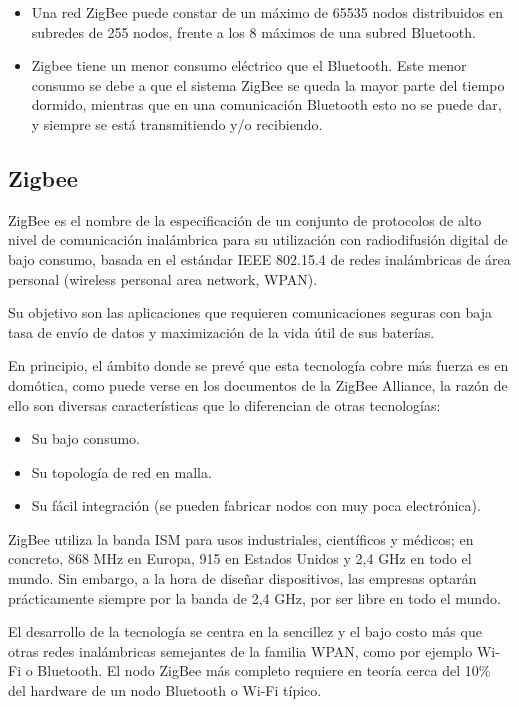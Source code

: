 \begin{itemize}
\item Una red ZigBee puede constar de un m\'aximo de 65535 nodos distribuidos en subredes de 255 nodos, frente a los 8
m\'aximos de una subred Bluetooth. 
\item Zigbee tiene un menor consumo el\'ectrico que el Bluetooth. Este menor consumo se debe a que el sistema ZigBee se
queda la mayor parte del tiempo dormido, mientras que en una comunicaci\'on Bluetooth esto no se puede dar, y siempre se
est\'a transmitiendo y/o recibiendo.
\end{itemize}



\subsection{Zigbee}
ZigBee es el nombre de la especificaci\'on de un conjunto de protocolos de alto nivel de comunicaci\'on inal\'ambrica para su
utilizaci\'on con radiodifusi\'on digital de bajo consumo, basada en el est\'andar IEEE 802.15.4 de redes inal\'ambricas de
\'area personal (wireless personal area network, WPAN).

Su objetivo son las aplicaciones que requieren comunicaciones seguras con baja tasa de env\'io de datos y maximizaci\'on de
la vida \'util de sus bater\'ias.

En principio, el \'ambito donde se prev\'e que esta tecnolog\'ia cobre m\'as fuerza es en dom\'otica, como puede verse en los
documentos de la ZigBee Alliance, la raz\'on de ello son diversas caracter\'isticas que lo diferencian de otras
tecnolog\'ias:

\begin{itemize}
\item Su bajo consumo.
\item Su topolog\'ia de red en malla.
\item Su f\'acil integraci\'on (se pueden fabricar nodos con muy poca electr\'onica).
\end{itemize}
ZigBee utiliza la banda ISM para usos industriales, cient\'ificos y m\'edicos; en concreto, 868 MHz en Europa, 915 en
Estados Unidos y 2,4 GHz en todo el mundo. Sin embargo, a la hora de dise\~nar dispositivos, las empresas optar\'an
pr\'acticamente siempre por la banda de 2,4 GHz, por ser libre en todo el mundo.

El desarrollo de la tecnolog\'ia se centra en la sencillez y el bajo costo m\'as que otras redes inal\'ambricas semejantes de
la familia WPAN, como por ejemplo Wi-Fi o Bluetooth. El nodo ZigBee m\'as completo requiere en teor\'ia cerca del 10\% del
hardware de un nodo Bluetooth o Wi-Fi t\'ipico.

